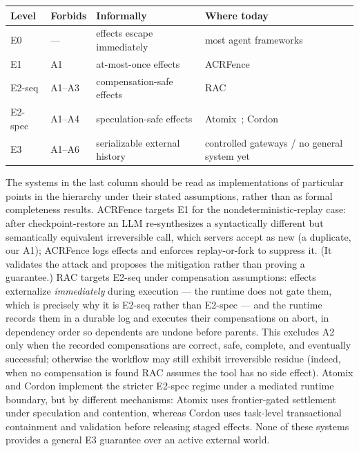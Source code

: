 \documentclass[11pt]{article}
\begin{document}
\begin{center}
\begin{tabular}{l l p{3.2cm} p{3.6cm}}
\textbf{Level} & \textbf{Forbids} & \textbf{Informally} & \textbf{Where today} \\
\hline
E0 & --- & effects escape immediately & most agent frameworks \\
E1 & A1 & at-most-once effects & ACRFence~\cite{zheng2026acrfence} \\
E2-seq & A1--A3 & compensation-safe effects & RAC~\cite{perera2026rac} \\
E2-spec & A1--A4 & speculation-safe effects & Atomix~\cite{mohammadi2026atomix}; Cordon~\cite{chen2026cordon} \\
E3 & A1--A6 & serializable external history & controlled gateways / no general system yet \\
\end{tabular}
\end{center}

The systems in the last column should be read as implementations of
particular points in the hierarchy under their stated assumptions, rather
than as formal completeness results. ACRFence targets E1 for the
nondeterministic-replay case: after checkpoint-restore an LLM re-synthesizes
a syntactically different but semantically equivalent irreversible call,
which servers accept as new (a duplicate, our A1); ACRFence logs effects and
enforces replay-or-fork to suppress it. (It validates the attack and
proposes the mitigation rather than proving a guarantee.)
RAC targets E2-seq under compensation assumptions: effects externalize
\emph{immediately} during execution --- the runtime does not gate them,
which is precisely why it is E2-seq rather than E2-spec --- and the runtime
records them in a durable log and executes their compensations on abort,
in dependency order so dependents are undone before parents. This excludes
A2 only when the recorded compensations are correct, safe, complete, and
eventually successful; otherwise the workflow may still exhibit irreversible
residue (indeed, when no compensation is found RAC assumes the tool has no
side effect).
Atomix and Cordon implement the stricter E2-spec regime
under a mediated runtime boundary, but by different mechanisms: Atomix
uses frontier-gated settlement under speculation and contention, whereas
Cordon uses task-level transactional containment and validation before
releasing staged effects. None of these systems provides a general E3
guarantee over an active external world.
\end{document}
